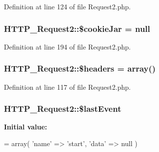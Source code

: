 Definition at line 124 of file Request2.\+php.

\hypertarget{classHTTP__Request2_a1a4f35074ef955bfe726e85b76ed17a9}{}
\subsubsection[{\$cookie\+Jar}]{\setlength{\rightskip}{0pt plus 5cm}H\+T\+T\+P\+\_\+\+Request2\+::\$cookie\+Jar = null\hspace{0.3cm}{\ttfamily [protected]}}\label{classHTTP__Request2_a1a4f35074ef955bfe726e85b76ed17a9}


Definition at line 194 of file Request2.\+php.

\hypertarget{classHTTP__Request2_a0d70f1b39d77f1e8bca7cd984d25192e}{}
\subsubsection[{\$headers}]{\setlength{\rightskip}{0pt plus 5cm}H\+T\+T\+P\+\_\+\+Request2\+::\$headers = array()\hspace{0.3cm}{\ttfamily [protected]}}\label{classHTTP__Request2_a0d70f1b39d77f1e8bca7cd984d25192e}


Definition at line 117 of file Request2.\+php.

\hypertarget{classHTTP__Request2_a53a051d2cfcad3fc688b7974c996e750}{}
\subsubsection[{\$last\+Event}]{\setlength{\rightskip}{0pt plus 5cm}H\+T\+T\+P\+\_\+\+Request2\+::\$last\+Event\hspace{0.3cm}{\ttfamily [protected]}}\label{classHTTP__Request2_a53a051d2cfcad3fc688b7974c996e750}
{\bfseries Initial value\+:}
\begin{DoxyCode}
= array(
        \textcolor{stringliteral}{'name'} => \textcolor{stringliteral}{'start'},
        \textcolor{stringliteral}{'data'} => null
    )
\end{DoxyCode}


